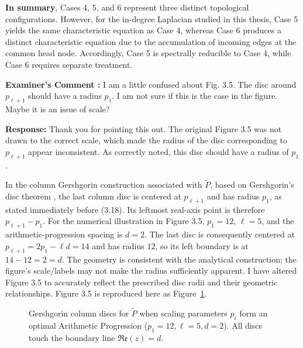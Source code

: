 \documentclass[11pt,a4paper]{article}
\newcounter{examcomment}
\renewcommand{\theexamcomment}{\arabic{examcomment}}
\newcommand{\comment}[1]{%
	\refstepcounter{examcomment}%
	\par\vspace{5pt}\noindent
	\colorbox{gray!13}{%
		\parbox{\dimexpr\linewidth-2\fboxsep}{%
			\textbf{Examiner's Comment \theexamcomment:} #1%
		}%
	}%
	\par
}
\newcommand{\response}{\par\textbf{Response:} }
\begin{document}
\medskip
\noindent
\textbf{In summary}, Cases 4, 5, and 6 represent three distinct topological configurations. However, for the in-degree Laplacian studied in this thesis, Case 5 yields the same characteristic equation as Case 4, whereas Case 6 produces a distinct characteristic equation due to the accumulation of incoming edges at the common head node. Accordingly, Case 5 is spectrally reducible to Case 4, while Case 6 requires separate treatment.

\comment{I am a little confused about Fig. 3.5. The disc around $p_{\ell+1}$ should have a radius $p_1$. I am not sure if this is the case in the figure. Maybe it is an issue of scale?}
\response
Thank you for pointing this out. The original Figure 3.5 was not drawn to the correct scale, which made the radius of the disc corresponding to $p_{\ell+1}$ appear inconsistent. As correctly noted, this disc should have a radius of $p_1$. 

In the column Gershgorin construction associated with $\widetilde P$, based on Gershgorin's disc theorem \cite{horn2012matrix}, the last column disc is centered at $p_{\ell+1}$ and has radius $p_1$, as stated immediately before (3.18). Its leftmost real-axis point is therefore $p_{\ell+1}-p_1$. For the numerical illustration in Figure 3.5, $p_1=12$, $\ell=5$, and the arithmetic-progression spacing is $d=2$. The last disc is consequently centered at $p_{\ell+1}=2p_1-\ell d=14$ and has radius $12$, so its left boundary is at $14-12=2=d$. The geometry is consistent with the analytical construction; the figure's scale/labels may not make the radius sufficiently apparent. I have altered Figure 3.5 to accurately reflect the prescribed disc radii and their geometric relationships.
Figure 3.5 is reproduced here as Figure~\ref{fig:GersgorinDiscInAP}.
\begin{figure}[H]
	\centering
	\caption{Gershgorin column discs for $\tilde{P}$ when scaling parameters $p_i$ form an optimal Arithmetic Progression ($p_1 = 12, \ell = 5, d = 2$). All discs touch the boundary line $\mathfrak{Re}(z) = d$.}
	\label{fig:GersgorinDiscInAP}
\end{figure}
\end{document}
